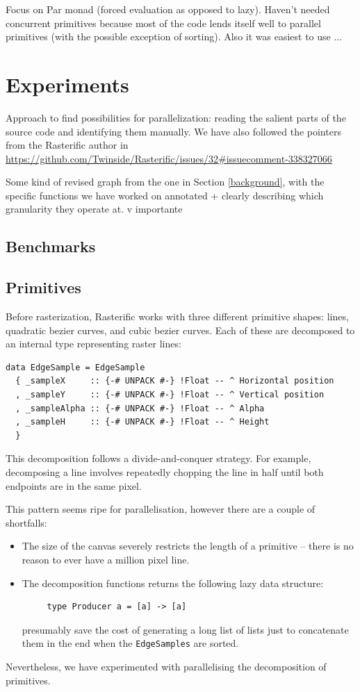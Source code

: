 \documentclass[12pt, a4paper]{article}
\begin{document}
Focus on Par monad (forced evaluation as opposed to lazy). Haven't needed concurrent primitives because most of the code lends itself well to parallel primitives (with the possible exception of sorting). Also it was easiest to use ...


\section{Experiments}\label{experiments}

Approach to find possibilities for parallelization: reading the salient parts of the source code and identifying them manually. We have also followed the pointers from the Rasterific author in \url{https://github.com/Twinside/Rasterific/issues/32#issuecomment-338327066}

Some kind of revised graph from the one in Section \ref{background}, with the specific functions we have worked on annotated + clearly describing which granularity they operate at. v importante


\subsection{Benchmarks}

\subsection{Primitives}
Before rasterization, Rasterific works with three different primitive shapes:
lines, quadratic bezier curves, and cubic bezier curves. Each of these are decomposed
to an internal type representing raster lines:
\begin{lstlisting}[caption={\texttt{EdgeSample} type -- represents a raster line.}]
data EdgeSample = EdgeSample
  { _sampleX     :: {-# UNPACK #-} !Float -- ^ Horizontal position
  , _sampleY     :: {-# UNPACK #-} !Float -- ^ Vertical position
  , _sampleAlpha :: {-# UNPACK #-} !Float -- ^ Alpha
  , _sampleH     :: {-# UNPACK #-} !Float -- ^ Height
  }
\end{lstlisting}
This decomposition follows a divide-and-conquer strategy. For example, decomposing a line
involves repeatedly chopping the line in half until both endpoints are in the same pixel.

This pattern seems ripe for parallelisation, however there are a couple of shortfalls:
\begin{itemize}
\item The size of the canvas severely restricts the length of a primitive -- there is no reason to ever
   have a million pixel line.
 \item The decomposition functions returns the following lazy data structure:
   \begin{lstlisting}
     type Producer a = [a] -> [a]\end{lstlisting}
   presumably save the cost of generating a long list of lists just to concatenate them in the end
    when the \texttt{EdgeSamples} are sorted.
  \end{itemize}
  Nevertheless, we have experimented with parallelising the decomposition of primitives.
\end{document}
